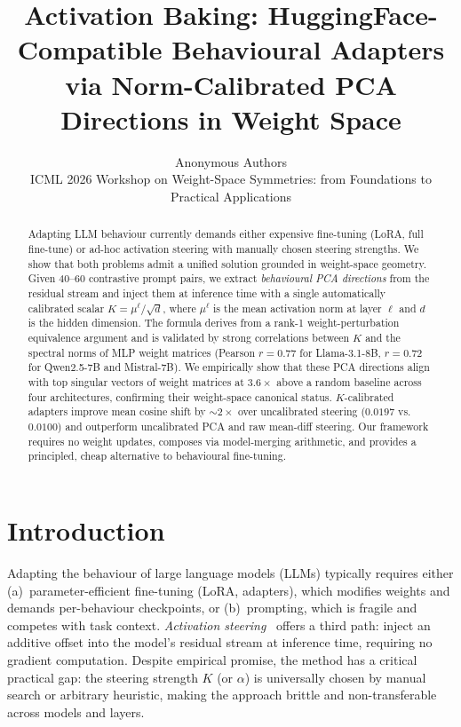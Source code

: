 \documentclass{article}
\title{Activation Baking: HuggingFace-Compatible Behavioural Adapters\\
via Norm-Calibrated PCA Directions in Weight Space}
\author{Anonymous Authors \\ ICML 2026 Workshop on Weight-Space Symmetries: from Foundations to Practical Applications}
\begin{document}
\maketitle

\begin{abstract}
Adapting LLM behaviour currently demands either expensive fine-tuning (LoRA, full
fine-tune) or ad-hoc activation steering with manually chosen steering strengths.
We show that both problems admit a unified solution grounded in weight-space geometry.
Given 40--60 contrastive prompt pairs, we extract \emph{behavioural PCA directions}
from the residual stream and inject them at inference time with a single automatically
calibrated scalar $K = \mu^\ell / \sqrt{d}$, where $\mu^\ell$ is the mean activation
norm at layer $\ell$ and $d$ is the hidden dimension.
The formula derives from a rank-1 weight-perturbation equivalence argument and is
validated by strong correlations between $K$ and the spectral norms of MLP weight
matrices (Pearson $r = 0.77$ for Llama-3.1-8B, $r = 0.72$ for Qwen2.5-7B and
Mistral-7B).
We empirically show that these PCA directions align with top singular vectors of
weight matrices at $3.6\times$ above a random baseline across four architectures,
confirming their weight-space canonical status.
$K$-calibrated adapters improve mean cosine shift by ${\sim}2\times$ over
uncalibrated steering ($0.0197$ vs.\ $0.0100$) and outperform uncalibrated PCA
and raw mean-diff steering.
Our framework requires no weight updates, composes via model-merging arithmetic, and
provides a principled, cheap alternative to behavioural fine-tuning.
\end{abstract}

\section{Introduction}
\label{sec:intro}

Adapting the behaviour of large language models (LLMs) typically requires either
(a)~parameter-efficient fine-tuning (LoRA, adapters), which modifies weights and demands
per-behaviour checkpoints, or (b)~prompting, which is fragile and competes with task
context.
\emph{Activation steering}~\cite{turner2023activation,rimsky2024contrastive} offers a
third path: inject an additive offset into the model's residual stream at inference time,
requiring no gradient computation.
Despite empirical promise, the method has a critical practical gap: the steering strength
$K$ (or $\alpha$) is universally chosen by manual search or arbitrary heuristic, making
the approach brittle and non-transferable across models and layers.
\end{document}
